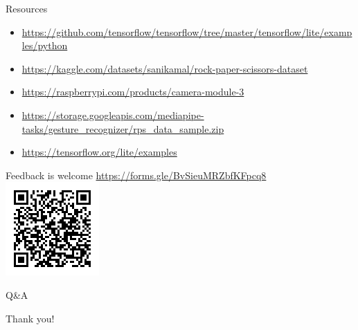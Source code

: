 \documentclass{beamer}
\begin{document}
\begin{frame}{Resources}
  \begin{itemize}
	\item \url{https://github.com/tensorflow/tensorflow/tree/master/tensorflow/lite/examples/python}
	\item \url{https://kaggle.com/datasets/sanikamal/rock-paper-scissors-dataset}
	\item \url{https://raspberrypi.com/products/camera-module-3}
	\item \url{https://storage.googleapis.com/mediapipe-tasks/gesture_recognizer/rps_data_sample.zip}
	\item \url{https://tensorflow.org/lite/examples}
  \end{itemize}
\end{frame}

\begin{frame}{Feedback is welcome}
  \url{https://forms.gle/BvSieuMRZbfKFpcq8}
  \includegraphics[width=\linewidth,height=0.75\textheight,keepaspectratio]{images/feedback.png}
\end{frame}

\begin{frame}{Q\&A}
  \begin{center}
Thank you!
  \end{center}
\end{frame}
\end{document}
